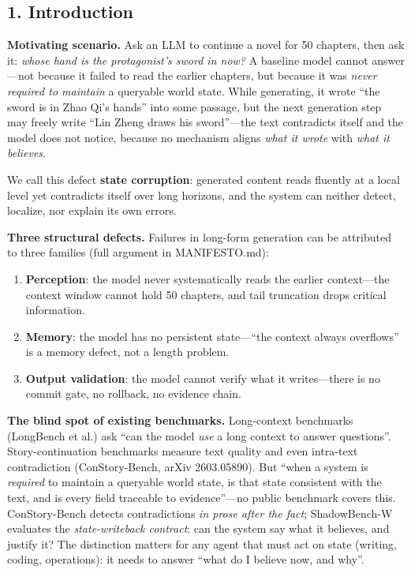 \documentclass[
  english,
]{article}
\providecommand{\tightlist}{%
  \setlength{\itemsep}{0pt}\setlength{\parskip}{0pt}}
\begin{document}
\subsection{1. Introduction}\label{introduction}

\textbf{Motivating scenario.} Ask an LLM to continue a novel for 50
chapters, then ask it: \emph{whose hand is the protagonist's sword in
now?} A baseline model cannot answer---not because it failed to read the
earlier chapters, but because it was \emph{never required to maintain} a
queryable world state. While generating, it wrote ``the sword is in Zhao
Qi's hands'' into some passage, but the next generation step may freely
write ``Lin Zheng draws his sword''---the text contradicts itself and
the model does not notice, because no mechanism aligns \emph{what it
wrote} with \emph{what it believes}.

We call this defect \textbf{state corruption}: generated content reads
fluently at a local level yet contradicts itself over long horizons, and
the system can neither detect, localize, nor explain its own errors.

\textbf{Three structural defects.} Failures in long-form generation can
be attributed to three families (full argument in MANIFESTO.md):

\begin{enumerate}
\def\labelenumi{\arabic{enumi}.}
\tightlist
\item
  \textbf{Perception}: the model never systematically reads the earlier
  context---the context window cannot hold 50 chapters, and tail
  truncation drops critical information.
\item
  \textbf{Memory}: the model has no persistent state---``the context
  always overflows'' is a memory defect, not a length problem.
\item
  \textbf{Output validation}: the model cannot verify what it
  writes---there is no commit gate, no rollback, no evidence chain.
\end{enumerate}

\textbf{The blind spot of existing benchmarks.} Long-context benchmarks
(LongBench et al.) ask ``can the model \emph{use} a long context to
answer questions''. Story-continuation benchmarks measure text quality
and even intra-text contradiction (ConStory-Bench, arXiv 2603.05890).
But ``when a system is \emph{required} to maintain a queryable world
state, is that state consistent with the text, and is every field
traceable to evidence''---no public benchmark covers this.
ConStory-Bench detects contradictions \emph{in prose after the fact};
ShadowBench-W evaluates the \emph{state-writeback contract}: can the
system say what it believes, and justify it? The distinction matters for
any agent that must act on state (writing, coding, operations): it needs
to answer ``what do I believe now, and why''.
\end{document}
